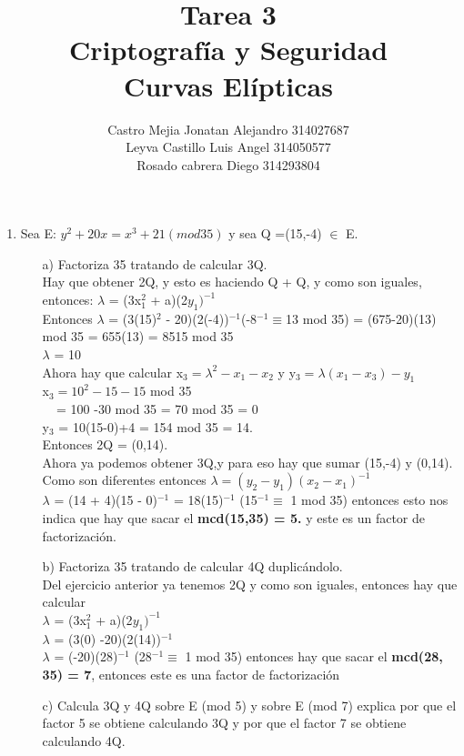 \documentclass[10pt,a4paper]{article}
\author{Castro Mejia Jonatan Alejandro 314027687\\Leyva Castillo Luis Angel 314050577 \\Rosado cabrera Diego  314293804}
\title{Tarea 3 \\Criptografía y Seguridad \\ Curvas Elípticas}
\begin{document}
\maketitle
\begin{enumerate}
\item Sea E: $y^{2}+20x= x^{3}+21(mod 35)$ y sea Q =(15,-4) $\in$ E.
\begin{itemize}
\item[a)] Factoriza 35 tratando de calcular 3Q.
\\Hay que obtener 2Q, y esto es haciendo Q + Q, y como son iguales, entonces: $\lambda$ = (3x$_{1}^{2}$ + a)(2$y_{1})^{-1}$ 
\\Entonces $\lambda$ = (3(15)$^{2}$ - 20)(2(-4))$^{-1}$(-8$^{-1} \equiv $13 mod 35) = (675-20)(13) mod 35 = 655(13) = 8515 mod 35\\
$\lambda$ = 10 \\
Ahora hay que calcular x$_{3} = \lambda ^{2}- x_{1}- x_{2}$ y y$_{3} = \lambda(x_{1} - x_{3})-y_{1}$
\\x$_{3} = 10^{2}-15-15$ mod 35 
\\$~~~~~$= 100 -30 mod 35 = 70 mod 35 = 0
\\y$_{3}$ = 10(15-0)+4 = 154 mod 35 = 14.
\\Entonces 2Q = (0,14).
\\Ahora ya podemos obtener 3Q,y para eso hay que sumar (15,-4) y (0,14).
\\Como son diferentes entonces $\lambda = (y_{2} - y_{1})(x_{2} - x_{1})^{-1}$
\\$\lambda$ = (14 + 4)(15 - 0)$^{-1}$ = 18(15)$^{-1}$ (15$^{-1} \equiv$ 1 mod 35) entonces esto nos indica que hay que sacar el \textbf{mcd(15,35) = 5.} y este es un factor de factorización. 
\item[b)] Factoriza 35 tratando de calcular 4Q duplicándolo.
\\Del ejercicio anterior ya tenemos 2Q y como son iguales, entonces hay que calcular\\ $\lambda$ = (3x$_{1}^{2}$ + a)(2$y_{1})^{-1}$
\\ $\lambda$ = (3(0) -20)(2(14))$^{-1}$
\\ $\lambda$ = (-20)(28)$^{-1}$ (28$^{-1} \equiv $ 1 mod 35) entonces hay que sacar el \textbf{mcd(28, 35) = 7}, entonces este es una factor de factorización
\item[c)] Calcula 3Q y 4Q sobre E (mod 5) y sobre E (mod 7) explica por que el factor 5 se obtiene calculando 3Q y por que el factor 7 se obtiene calculando 4Q.


\end{itemize}
\end{enumerate}
\end{document}

